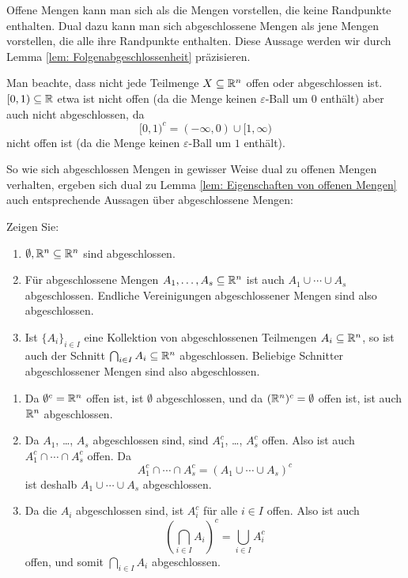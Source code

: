 \documentclass[a4paper,10pt]{article}
\begin{document}
Offene Mengen kann man sich als die Mengen vorstellen, die keine Randpunkte enthalten. Dual dazu kann man sich abgeschlossene Mengen als jene Mengen vorstellen, die alle ihre Randpunkte enthalten. Diese Aussage werden wir durch Lemma \ref{lem: Folgenabgeschlossenheit} präzisieren.


Man beachte, dass nicht jede Teilmenge $X \subseteq \mathbb{R}^n$ offen oder abgeschlossen ist. $[0,1) \subseteq \mathbb{R}$ etwa ist nicht offen (da die Menge keinen $\varepsilon$-Ball um $0$ enthält) aber auch nicht abgeschlossen, da
\[
 [0,1)^c = (-\infty,0) \cup [1,\infty)
\]
nicht offen ist (da die Menge keinen $\varepsilon$-Ball um $1$ enthält).


So wie sich abgeschlossen Mengen in gewisser Weise dual zu offenen Mengen verhalten, ergeben sich dual zu Lemma \ref{lem: Eigenschaften von offenen Mengen} auch entsprechende Aussagen über abgeschlossene Mengen:


\begin{question}
 Zeigen Sie:
 \begin{enumerate}
  \item
   $\emptyset, \mathbb{R}^n \subseteq \mathbb{R}^n$ sind abgeschlossen.
  \item
   Für abgeschlossene Mengen $A_1, \dotsc, A_s \subseteq \mathbb{R}^n$ ist auch $A_1 \cup \dotsb \cup A_s$ abgeschlossen. Endliche Vereinigungen abgeschlossener Mengen sind also abgeschlossen.
  \item
   Ist $\{A_i\}_{i \in I}$ eine Kollektion von abgeschlossenen Teilmengen $A_i \subseteq \mathbb{R}^n$, so ist auch der Schnitt $\bigcap_{i \in I} A_i \subseteq \mathbb{R}^n$ abgeschlossen. Beliebige Schnitter abgeschlossener Mengen sind also abgeschlossen.
 \end{enumerate}
\end{question}
\begin{solution}
 \begin{enumerate}
  \item
   Da $\emptyset^c = \mathbb{R}^n$ offen ist, ist $\emptyset$ abgeschlossen, und da $(\mathbb{R}^n)^c = \emptyset$ offen ist, ist auch $\mathbb{R}^n$ abgeschlossen.
  \item
   Da $A_1$, \dots, $A_s$ abgeschlossen sind, sind $A_1^c$, \dots, $A_s^c$ offen. Also ist auch $A_1^c \cap \dotsb \cap A_s^c$ offen. Da
   \[
    A_1^c \cap \dotsb \cap A_s^c
    = (A_1 \cup \dotsb \cup A_s)^c
   \]
   ist deshalb $A_1 \cup \dotsb \cup A_s$ abgeschlossen.
  \item
   Da die $A_i$ abgeschlossen sind, ist $A_i^c$ für alle $i \in I$ offen. Also ist auch
   \[
    \left( \bigcap_{i \in I} A_i \right)^c
    = \bigcup_{i \in I} A_i^c
   \]
   offen, und somit $\bigcap_{i \in I} A_i$ abgeschlossen.
 \end{enumerate}
\end{solution}
\end{document}
